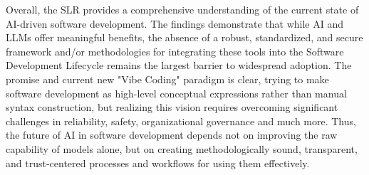 Overall, the SLR provides a comprehensive understanding of the current state of AI-driven software development. The findings demonstrate that while AI and LLMs offer meaningful benefits, the absence of a robust, standardized, and secure framework and/or methodologies for integrating these tools into the Software Development Lifecycle remains the largest barrier to widespread adoption. The promise and current new "Vibe Coding" paradigm is clear, trying to make software development as high-level conceptual expressions rather than manual syntax construction, but realizing this vision requires overcoming significant challenges in reliability, safety, organizational governance and much more. Thus, the future of AI in software development depends not on improving the raw capability of models alone, but on creating methodologically sound, transparent, and trust-centered processes and workflows for using them effectively.

